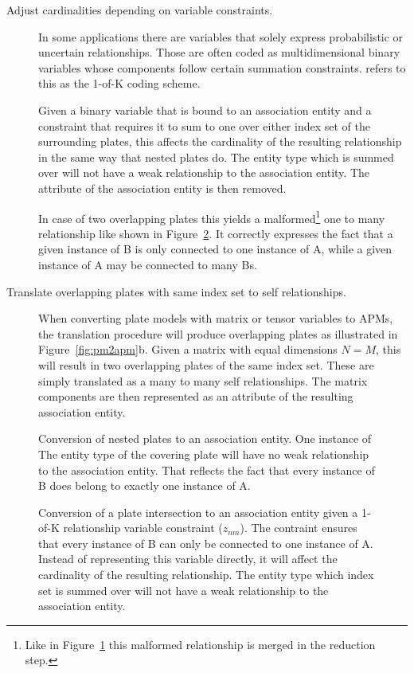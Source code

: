 \begin{description}
\item[Adjust cardinalities depending on variable constraints.] In some applications there are variables that solely express probabilistic or uncertain relationships. Those are often coded as multidimensional binary variables whose components follow certain summation constraints. \textcite{bishop2006pattern} refers to this as the 1-of-K coding scheme.

Given a binary variable that is bound to an association entity and a constraint that requires it to sum to one over either index set of the surrounding plates, this affects the cardinality of the resulting relationship in the same way that nested plates do. The entity type which is summed over will not have a weak relationship to the association entity. The attribute of the association entity is then removed.

In case of two overlapping plates this yields a malformed\footnote{Like in Figure~\ref{fig:pm2erm_covered_1} this malformed relationship is merged in the reduction step.} one to many relationship like shown in Figure~\ref{fig:pm2erm_bi_constraints}. It correctly expresses the fact that a given instance of B is only connected to one instance of A, while a given instance of A may be connected to many Bs.

\item[Translate overlapping plates with same index set to self relationships.] When converting plate models with matrix or tensor variables to APMs, the translation procedure will produce overlapping plates as illustrated in Figure~\ref{fig:pm2apm}b. Given a matrix with equal dimensions $N = M$, this will result in two overlapping plates of the same index set. These are simply translated as a many to many self relationships. The matrix components are then represented as an attribute of the resulting association entity.
\end{description}

\begin{figure}[p]
\centering
\scalebox{\tikzScale}{\adjustTikzSize }
\caption{Conversion of nested plates to an association entity. One instance of  The entity type of the covering plate will have no weak relationship to the association entity. That reflects the fact that every instance of B does belong to exactly one instance of A.}\label{fig:pm2erm_covered_1}
\end{figure}

\begin{figure}[p]
\centering
\scalebox{\tikzScale}{\adjustTikzSize }
\caption{Conversion of a plate intersection to an association entity given a 1-of-K relationship variable constraint ($z_{nm}$). The contraint ensures that every instance of B can only be connected to one instance of A. Instead of representing this variable directly, it will affect the cardinality of the resulting relationship. The entity type which index set is summed over will not have a weak relationship to the association entity.}\label{fig:pm2erm_bi_constraints}
\end{figure}

